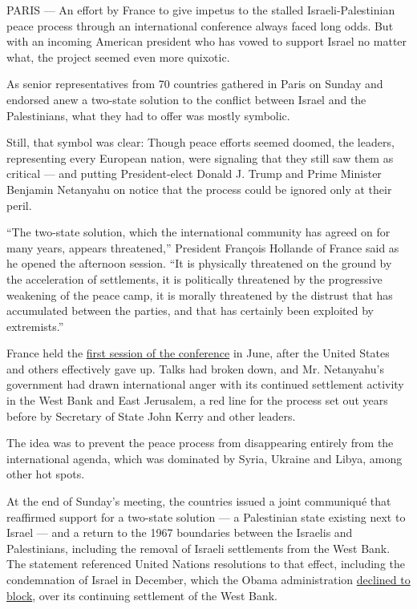 PARIS --- An effort by France to give impetus to the stalled
Israeli-Palestinian peace process through an international conference
always faced long odds. But with an incoming American president who has
vowed to support Israel no matter what, the project seemed even more
quixotic.

As senior representatives from 70 countries gathered in Paris on Sunday
and endorsed anew a two-state solution to the conflict between Israel
and the Palestinians, what they had to offer was mostly symbolic.

Still, that symbol was clear: Though peace efforts seemed doomed, the
leaders, representing every European nation, were signaling that they
still saw them as critical --- and putting President-elect Donald J.
Trump and Prime Minister Benjamin Netanyahu on notice that the process
could be ignored only at their peril.

``The two-state solution, which the international community has agreed
on for many years, appears threatened,'' President François Hollande of
France said as he opened the afternoon session. ``It is physically
threatened on the ground by the acceleration of settlements, it is
politically threatened by the progressive weakening of the peace camp,
it is morally threatened by the distrust that has accumulated between
the parties, and that has certainly been exploited by extremists.''

France held the
\href{https://www.nytimes.com/2016/06/04/world/europe/france-hosts-talks-on-restarting-mideast-peace-process.html}{first
session of the conference} in June, after the United States and others
effectively gave up. Talks had broken down, and Mr. Netanyahu's
government had drawn international anger with its continued settlement
activity in the West Bank and East Jerusalem, a red line for the process
set out years before by Secretary of State John Kerry and other leaders.

The idea was to prevent the peace process from disappearing entirely
from the international agenda, which was dominated by Syria, Ukraine and
Libya, among other hot spots.

At the end of Sunday's meeting, the countries issued a joint communiqué
that reaffirmed support for a two-state solution --- a Palestinian state
existing next to Israel --- and a return to the 1967 boundaries between
the Israelis and Palestinians, including the removal of Israeli
settlements from the West Bank. The statement referenced United Nations
resolutions to that effect, including the condemnation of Israel in
December, which the Obama administration
\href{https://www.nytimes.com/2016/12/23/world/middleeast/israel-settlements-un-vote.html}{declined
to block}, over its continuing settlement of the West Bank.

